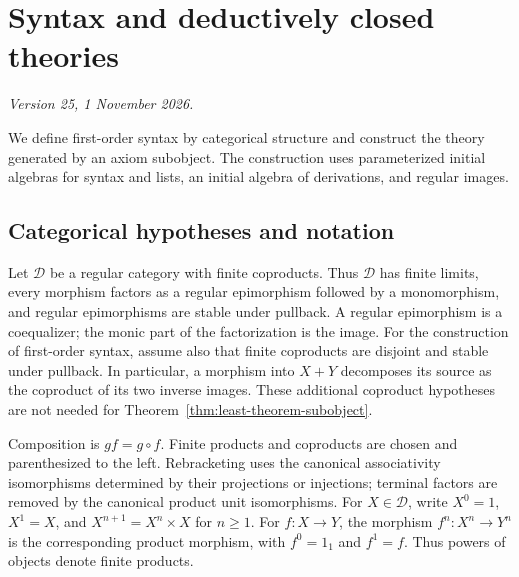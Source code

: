 \documentclass[11pt]{article}
\theoremstyle{definition}\newtheorem{definition}[theorem]{Definition}
\begin{document}
\appendix
\section{Syntax and deductively closed theories}
\label{app:syntax-theories}
\noindent\textit{Version 25, 1 November 2026.}\par\medskip

We define first-order syntax by categorical structure and construct
the theory generated by an axiom subobject. The construction uses
parameterized initial algebras for syntax and lists, an initial algebra
of derivations, and regular images.

\subsection{Categorical hypotheses and notation}
\label{app:categorical-hypotheses}

Let $\mathcal D$ be a regular category with finite coproducts.
Thus $\mathcal D$ has finite limits, every morphism factors as a
regular epimorphism followed by a monomorphism, and regular
epimorphisms are stable under pullback. A regular epimorphism is a
coequalizer; the monic part of the factorization is the image.
For the construction of first-order syntax, assume also that finite
coproducts are disjoint and stable under pullback. In particular,
a morphism into $X+Y$ decomposes its source as the coproduct of its
two inverse images. These additional coproduct hypotheses are not
needed for Theorem~\ref{thm:least-theorem-subobject}.

Composition is $gf=g\circ f$. Finite products and coproducts are
chosen and parenthesized to the left. Rebracketing uses the canonical
associativity isomorphisms determined by their projections or injections;
terminal factors are removed by the canonical product unit isomorphisms.
For $X\in\mathcal D$, write $X^0=1$, $X^1=X$, and
$X^{n+1}=X^n\times X$ for $n\geq1$.
For $f:X\to Y$, the morphism $f^n:X^n\to Y^n$ is the corresponding
product morphism, with $f^0=1_1$ and $f^1=f$.
Thus powers of objects denote finite products.
\end{document}
